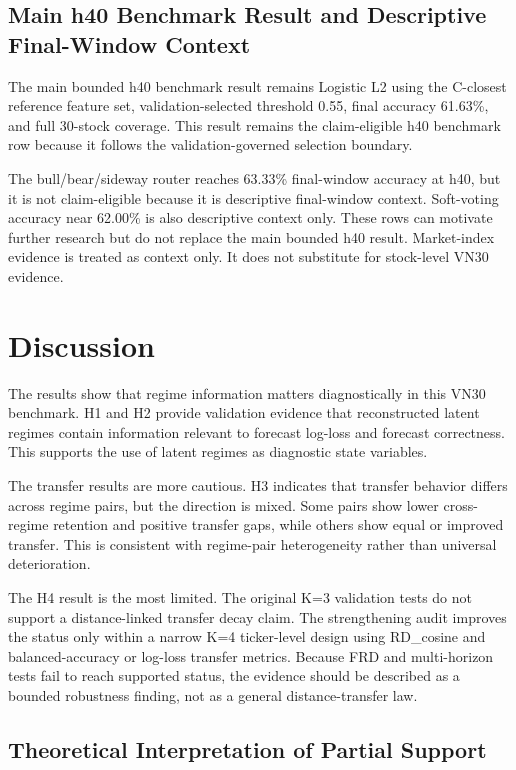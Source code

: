 \documentclass[12pt,a4paper]{article}
\begin{document}
\subsection{Main h40 Benchmark Result and Descriptive Final-Window Context}

The main bounded h40 benchmark result remains Logistic L2 using the C-closest reference feature set, validation-selected threshold 0.55, final accuracy 61.63\%, and full 30-stock coverage. This result remains the claim-eligible h40 benchmark row because it follows the validation-governed selection boundary.

The bull/bear/sideway router reaches 63.33\% final-window accuracy at h40, but it is not claim-eligible because it is descriptive final-window context. Soft-voting accuracy near 62.00\% is also descriptive context only. These rows can motivate further research but do not replace the main bounded h40 result. Market-index evidence is treated as context only. It does not substitute for stock-level VN30 evidence.

\section{Discussion}

The results show that regime information matters diagnostically in this VN30 benchmark. H1 and H2 provide validation evidence that reconstructed latent regimes contain information relevant to forecast log-loss and forecast correctness. This supports the use of latent regimes as diagnostic state variables.

The transfer results are more cautious. H3 indicates that transfer behavior differs across regime pairs, but the direction is mixed. Some pairs show lower cross-regime retention and positive transfer gaps, while others show equal or improved transfer. This is consistent with regime-pair heterogeneity rather than universal deterioration.

The H4 result is the most limited. The original K=3 validation tests do not support a distance-linked transfer decay claim. The strengthening audit improves the status only within a narrow K=4 ticker-level design using RD\_cosine and balanced-accuracy or log-loss transfer metrics. Because FRD and multi-horizon tests fail to reach supported status, the evidence should be described as a bounded robustness finding, not as a general distance-transfer law.

\subsection{Theoretical Interpretation of Partial Support}
\end{document}
